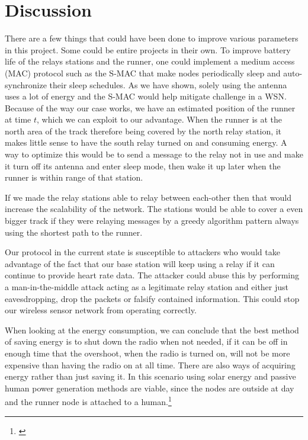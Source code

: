 \section{Discussion}

There are a few things that could have been done to improve various parameters in this project. Some could be entire projects in their own. To improve battery life of the relays stations and the runner, one could implement a medium access (MAC) protocol such as the S-MAC that make nodes periodically sleep and auto-synchronize their sleep schedules. As we have shown, solely using the antenna uses a lot of energy and the S-MAC would help mitigate challenge in a WSN. Because of the way our case works, we have an estimated position of the runner at time $t$, which we can exploit to our advantage. When the runner is at the north area of the track therefore being covered by the north relay station, it makes little sense to have the south relay turned on and consuming energy. A way to optimize this would be to send a message to the relay not in use and make it turn off its antenna and enter sleep mode, then wake it up later when the runner is within range of that station.

\noindent If we made the relay stations able to relay between each-other then that would increase the scalability of the network. The stations would be able to cover a even bigger track if they were relaying messages by a greedy algorithm pattern always using the shortest path to the runner.

\noindent Our protocol in the current state is susceptible to attackers who would take advantage of the fact that our base station will keep using a relay if it can continue to provide heart rate data. The attacker could abuse this by performing a man-in-the-middle attack acting as a legitimate relay station and either just eavesdropping, drop the packets or falsify contained information. This could stop our wireless sensor network from operating correctly.

\noindent When looking at the energy consumption, we can conclude that the best method of saving energy is to shut down the radio when not needed, if it can be off in enough time that the overshoot, when the radio is turned on, will not be more expensive than having the radio on at all time. There are also ways of acquiring energy rather than just saving it. In this scenario using solar energy and passive human power generation methods are viable, since the nodes are outside at day and the runner node is attached to a human.\footnote{\cite{Sudevalayam2011}}